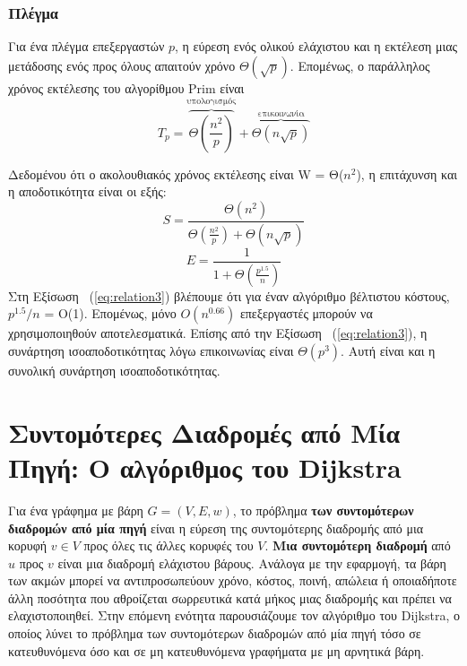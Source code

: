 \documentclass[12pt,a4paper]{article}
\begin{document}
\vspace{0.3cm}
\subsubsection*{Πλέγμα}
Για ένα πλέγμα επεξεργαστών $p$, η εύρεση ενός ολικού ελάχιστου και η εκτέλεση μιας μετάδοσης ενός προς όλους απαιτούν χρόνο $\Theta(\sqrt{p})$. Επομένως, ο παράλληλος χρόνος εκτέλεσης του αλγορίθμου \foreignlanguage{english}{Prim} είναι 
\begin{equation}
T_p = \overbrace{\Theta\!\left(\frac{n^2}{p}\right)}^{\text{υπολογισμός}}
+ \overbrace{\Theta(n \sqrt{p})}^{\text{επικοινωνία}}
\label{eq:relation2}
\end{equation}

Δεδομένου ότι ο ακολουθιακός χρόνος εκτέλεσης είναι W = Θ($n^2$), η επιτάχυνση και η αποδοτικότητα είναι οι εξής:
\[
S = \frac{\Theta(n^2)}{\Theta\!\left(\frac{n^2}{p}\right) + \Theta(n\sqrt{p})}
\]
\begin{equation}
E = \frac{1}{1 + \Theta\!\left(\frac{p^{1.5}}{n}\right)}
\label{eq:relation3}
\end{equation}
Στη Εξίσωση ~(\ref{eq:relation3}) βλέπουμε ότι για έναν αλγόριθμο βέλτιστου κόστους, $p^{1.5}/n$ = O(1). Επομένως, μόνο $O(n^{0.66})$ επεξεργαστές μπορούν να χρησιμοποιηθούν αποτελεσματικά. Επίσης από την Εξίσωση ~(\ref{eq:relation3}), η συνάρτηση ισοαποδοτικότητας λόγω επικοινωνίας είναι $\Theta(p^3)$. Αυτή είναι και η συνολική συνάρτηση ισοαποδοτικότητας. 
\vspace{0.5cm}

\section{Συντομότερες Διαδρομές από Μία Πηγή: Ο αλγόριθμος του \foreignlanguage{english}{Dijkstra}}

Για ένα γράφημα με βάρη $G = (V, E, w)$, το πρόβλημα \textbf{των συντομότερων διαδρομών από μία πηγή} είναι η εύρεση της συντομότερης διαδρομής από μια κορυφή $v \in V$ προς όλες τις άλλες κορυφές του $V$. \textbf{Μια συντομότερη διαδρομή} από $u$ προς $v$ είναι μια διαδρομή ελάχιστου βάρους. Ανάλογα με την εφαρμογή, τα βάρη των ακμών μπορεί να αντιπροσωπεύουν χρόνο, κόστος, ποινή, απώλεια ή οποιαδήποτε άλλη ποσότητα που αθροίζεται σωρρευτικά κατά μήκος μιας διαδρομής και πρέπει να ελαχιστοποιηθεί. Στην επόμενη ενότητα παρουσιάζουμε τον αλγόριθμο του \foreignlanguage{english}{Dijkstra}, ο οποίος λύνει το πρόβλημα των συντομότερων διαδρομών από μία πηγή τόσο σε κατευθυνόμενα όσο και σε μη κατευθυνόμενα γραφήματα με μη αρνητικά βάρη.
\end{document}

